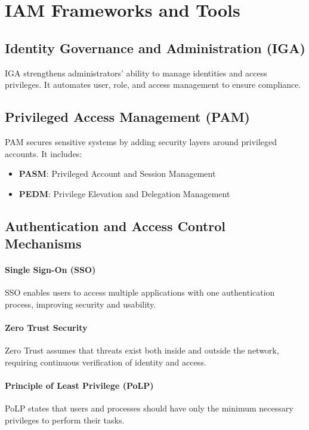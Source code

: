 \section{IAM Frameworks and Tools}

\subsection{Identity Governance and Administration (IGA)}
IGA strengthens administrators' ability to manage identities and access privileges. It automates user, role, and access management to ensure compliance\citep{StrongDM-IGAvsPAM,CoreSec-DiffIAMIGAPAM}.

\subsection{Privileged Access Management (PAM)}
PAM secures sensitive systems by adding security layers around privileged accounts\citep{StrongDM-IGAvsPAM,CoreSec-DiffIAMIGAPAM}. It includes:
\begin{itemize}
	\item \textbf{PASM}: Privileged Account and Session Management
	\item \textbf{PEDM}: Privilege Elevation and Delegation Management
\end{itemize}

\subsection{Authentication and Access Control Mechanisms}
\paragraph{Single Sign-On (SSO)}
SSO enables users to access multiple applications with one authentication process, improving security and usability.

\paragraph{Zero Trust Security}
Zero Trust assumes that threats exist both inside and outside the network, requiring continuous verification of identity and access.

\paragraph{Principle of Least Privilege (PoLP)}
PoLP states that users and processes should have only the minimum necessary privileges to perform their tasks\citep{OGDef-PoLP}.

